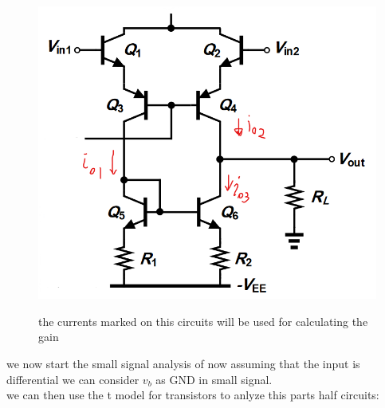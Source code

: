 \documentclass[11pt]{article}
\begin{document}
\begin{figure}[H]
    \begin{center}
        \includegraphics[scale=0.7]{Fig/smallSigCircuit.png}
        \label{fig:smallSignalCircuit}
        \caption{the currents marked on this circuits will be used for calculating the gain}
    \end{center}
\end{figure}
we now start the small signal analysis of 
now assuming that the input is differential we can consider $v_b$ as GND in small signal. \\
we can then use the t model for transistors to anlyze this parts half circuits:
\end{document}

